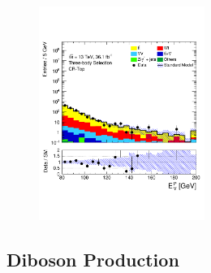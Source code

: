 \begin{figure}[!htb]
    \begin{center}
        \includegraphics[width=0.48\textwidth]{figures/search_stop2l/bkg_est/crtop/crt_MDR}
    \end{center}
\end{figure}



%
%

\subsection{Diboson Production}
\label{sec:stop_vv_estimate}

